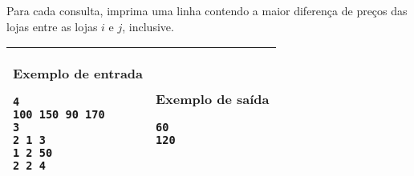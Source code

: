 Para cada consulta, imprima uma linha contendo a maior diferença de preços das
lojas entre as lojas $i$ e $j$, inclusive.

\begin{table}[!h]
\centering
\begin{tabular}{|l|l|}
\hline
\begin{minipage}[t]{3in}
\textbf{Exemplo de entrada}
\begin{verbatim}
4
100 150 90 170
3
2 1 3
1 2 50
2 2 4
\end{verbatim}
\vspace{1mm}
\end{minipage}
&

\begin{minipage}[t]{3in}
\textbf{Exemplo de saída}
\begin{verbatim}
60
120
\end{verbatim}
\vspace{1mm}
\end{minipage} \\
\hline
\end{tabular}
\end{table}
